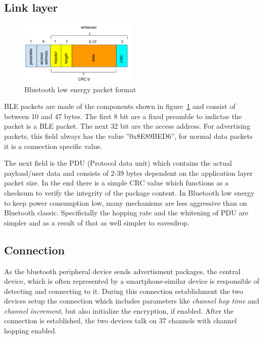 \documentclass[conference]{IEEEtran}
\begin{document}
\subsection{Link layer} \label{ssec:link}

\begin{figure}
  \centering
    \includegraphics[width=0.5\textwidth]{blepacketformat}
    \caption{Bluetooth low energy packet format \cite{imgsrc:packetformat} }
  \label{fig:packetformat}
\end{figure}

BLE packets are made of the components shown in figure~\ref{fig:packetformat} 
and consist of between 10 and 47 bytes. The first 8 bit are a fixed preamble 
to indictae the packet is a BLE packet. The next 32 bit are the access address. 
For advertising packets, this field always has the value ''0x8E89BED6'', for 
normal 
data packets it is a connection specific value. 

The next field is the 
PDU (Protocol data unit) which contains the actual payload/user data and 
consists of 2-39 bytes dependent on the application layer packet size. In the 
end there is a simple CRC value which functions as a checksum to verify the 
integrity of the package content.
In Bluetooth low energy to keep power consumption low, many mechanisms are less aggressive than on Bluetooth classic. Specificially the hopping rate and the whitening of PDU are simpler and as a result of that as well simpler to eavesdrop.

\subsection{Connection} \label{ssec:con}

As the bluetooth peripheral device sends advertisment packages, the central device, which is often represented by a smartphone-similar device is responsible of detecting and connecting to it. During this connection establishment the two devices setup the connection which includes parameters like \emph{channel hop time} and \emph{channel increment}, but also initialize the encryption, if enabled. After the connection is established, the two devices talk on 37 channels with channel hopping enabled.
\end{document}
